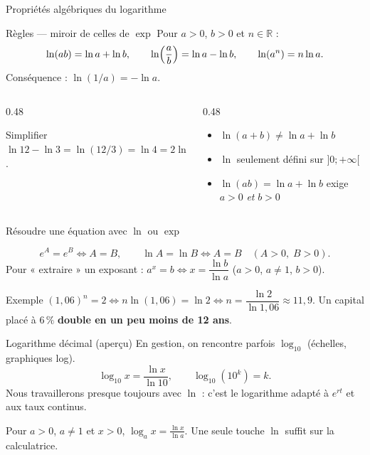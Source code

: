 \documentclass[10pt,aspectratio=169]{beamer}
\numberwithin{dummy}{section}
\newcommand{\R}{\mathbb{R}}
\begin{document}
\begin{frame}{Propriétés algébriques du logarithme}
\begin{block}{Règles --- miroir de celles de $\exp$}
Pour $a>0$, $b>0$ et $n\in\R$ :
\[
\ln(ab)=\ln a+\ln b,\qquad
\ln\Bigl(\frac{a}{b}\Bigr)=\ln a-\ln b,\qquad
\ln(a^n)=n\ln a.
\]
Conséquence : $\ln(1/a)=-\ln a$.
\end{block}

\vspace{0.25em}
\begin{columns}[T]
\begin{column}{0.48\textwidth}
\begin{exampleblock}{Simplifier}
$\ln 12-\ln 3=\ln(12/3)=\ln 4=2\ln 2$.
\end{exampleblock}
\end{column}
\begin{column}{0.48\textwidth}
\begin{boxattention}
\begin{itemize}
    \item $\ln(a+b)\neq \ln a+\ln b$
    \item $\ln$ seulement défini sur $]0;+\infty[$
    \item $\ln(ab)=\ln a+\ln b$ exige $a>0$ \emph{et} $b>0$
\end{itemize}
\end{boxattention}
\end{column}
\end{columns}
\end{frame}

\begin{frame}{Résoudre une équation avec $\ln$ ou $\exp$}
\begin{boxmethode}
\[
e^A=e^B \iff A=B,
\qquad
\ln A=\ln B \iff A=B \quad (A>0,\; B>0).
\]
Pour « extraire » un exposant : $a^x=b \iff x=\dfrac{\ln b}{\ln a}$
($a>0$, $a\neq 1$, $b>0$).
\end{boxmethode}

\begin{exampleblock}{Exemple}
$(1{,}06)^n=2 \iff n\ln(1{,}06)=\ln 2 \iff n=\dfrac{\ln 2}{\ln 1{,}06}\approx 11{,}9$.
Un capital placé à $6\,\%$ \textbf{double en un peu moins de 12 ans}.
\end{exampleblock}
\end{frame}

\begin{frame}{Logarithme décimal (aperçu)}
En gestion, on rencontre parfois $\log_{10}$ (échelles, graphiques log).
\[
\log_{10} x=\frac{\ln x}{\ln 10},\qquad \log_{10}(10^k)=k.
\]
Nous travaillerons presque toujours avec $\ln$ : c'est le logarithme
adapté à $e^{rt}$ et aux taux continus.

\vspace{0.6em}
\begin{boxsynthese}
Pour $a>0$, $a\neq 1$ et $x>0$,
$\displaystyle \log_a x=\frac{\ln x}{\ln a}$.
Une seule touche $\ln$ suffit sur la calculatrice.
\end{boxsynthese}
\end{frame}
\end{document}
